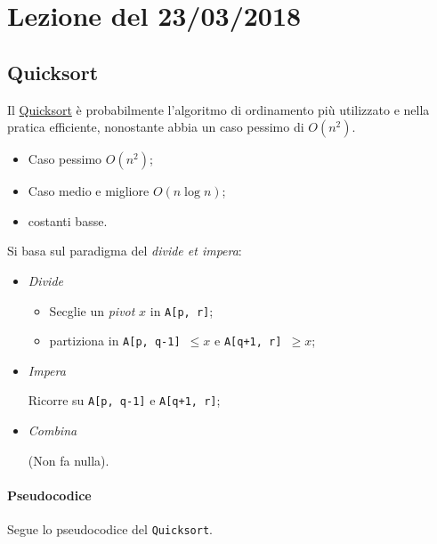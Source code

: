 \section{Lezione del 23/03/2018}

\subsection{Quicksort}
Il \href{https://en.wikipedia.org/wiki/Quicksort}{Quicksort} è probabilmente l'algoritmo di ordinamento
più utilizzato e nella pratica efficiente, nonostante abbia un caso pessimo di $O(n^2)$.
\begin{itemize}
	\item Caso pessimo $O(n^2)$;
	\item Caso medio e migliore $O(n \log n)$;
	\item costanti basse.
\end{itemize}
Si basa sul paradigma del \textit{divide et impera}:
\begin{itemize}
	\item \textit{Divide}
	\begin{itemize}[label=$\rightarrow$]
		\item Secglie un \textit{pivot} $x$ in \texttt{A[p, r]};
		\item partiziona in \texttt{A[p, q-1] $\leq x$} e \texttt{A[q+1, r] $\geq x$};
	\end{itemize}
	\item \textit{Impera} \par
	Ricorre su \texttt{A[p, q-1]} e \texttt{A[q+1, r]};
	\item \textit{Combina}\par
	(Non fa nulla).
\end{itemize}

\paragraph{Pseudocodice} Segue lo pseudocodice del \texttt{Quicksort}.



